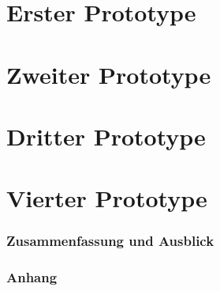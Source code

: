 \documentclass[a4paper,11pt]{article}
\begin{document}



\newpage
\renewcommand{\contentsname}{Inhaltsverzeichnis}
\tableofcontents
\clearpage





\newpage
\part{Erster Prototype}



\newpage
\part{Zweiter Prototype}



\newpage
\part{Dritter Prototype}



\newpage
\part{Vierter Prototype}



\newpage
\section{Zusammenfassung und Ausblick} \label{ende-sec}



\newpage 
\renewcommand{\listfigurename}{Abbildungsverzeichnis}
\listoffigures


\newpage
\renewcommand{\listtablename}{Tabellenverzeichnis}
\listoftables


\newpage



\newpage
\section*{Anhang}


\newpage


\end{document}
